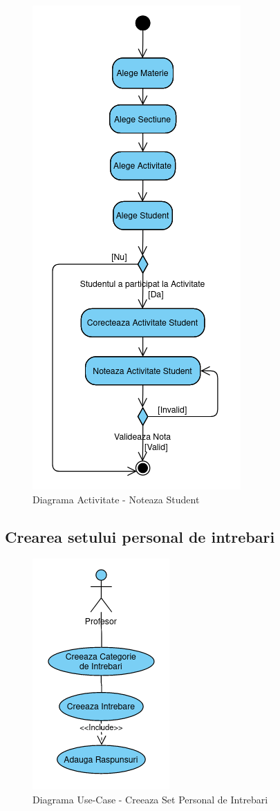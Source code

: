 \documentclass[12pt, a4paper, oneside, romanian]{teza-upb}
\begin{document}
\begin{figure}[H]
\centering
\includegraphics*[width=0.45\columnwidth]{diagrama-activitate-noteaza-student}
\caption{Diagrama Activitate - Noteaza Student}
\label{diagrama-activitate-noteaza-student}
\end{figure}

\subsection{Crearea setului personal de intrebari}

\begin{figure}[H]
\centering
\includegraphics*[width=0.3\columnwidth]{diagrama-use-case-creeaza-set-personal-de-intrebari}
\caption{Diagrama Use-Case - Creeaza Set Personal de Intrebari}
\label{diagrama-use-case-creeaza-set-personal-de-intrebari}
\end{figure}
\end{document}
